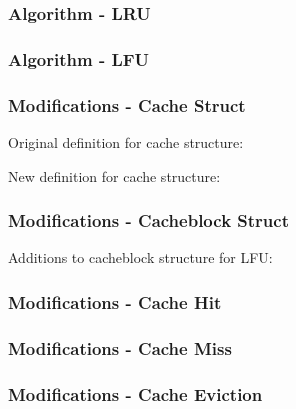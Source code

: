 \documentclass{beamer}
\begin{document}
\begin{frame}
  \frametitle{Algorithm - LRU}

  

\end{frame}

\begin{frame}
  \frametitle{Algorithm - LFU}

  

\end{frame}

\begin{frame}
  \frametitle{Modifications - Cache Struct}

  Original definition for cache structure:
  \begin{adjustbox}{width=\textwidth,keepaspectratio}
    
  \end{adjustbox}

  \vspace{\baselineskip}

  New definition for cache structure:
  \begin{adjustbox}{width=\textwidth,keepaspectratio}
    
  \end{adjustbox}

\end{frame}

\begin{frame}
  \frametitle{Modifications - Cacheblock Struct}

  Additions to cacheblock structure for LFU:
  \begin{adjustbox}{width=\textwidth,keepaspectratio}
    
  \end{adjustbox}

\end{frame}

\begin{frame}
  \frametitle{Modifications - Cache Hit}

  \begin{adjustbox}{width=\textwidth,height=0.42\textheight,keepaspectratio}
    
  \end{adjustbox}

\end{frame}

\begin{frame}
  \frametitle{Modifications - Cache Miss}

  \begin{adjustbox}{width=\textwidth,keepaspectratio}
    
  \end{adjustbox}

\end{frame}

\begin{frame}
  \frametitle{Modifications - Cache Eviction}

  \begin{adjustbox}{width=\textwidth,keepaspectratio}
    
  \end{adjustbox}

\end{frame}
\end{document}
